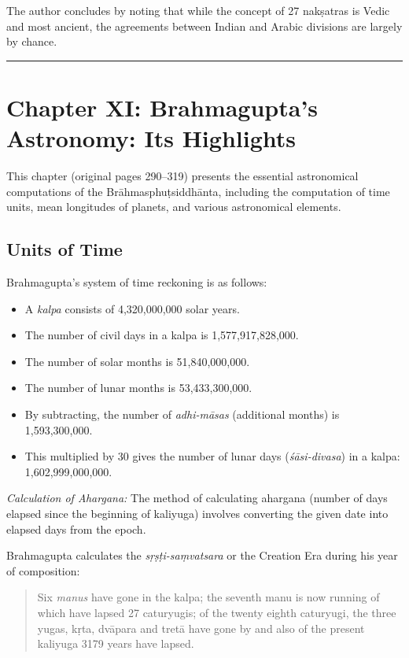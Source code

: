 \documentclass[11pt,a4paper]{article}
\newcommand{\longline}{\noindent\rule{\textwidth}{0.4pt}}
\theoremstyle{definition}
\begin{document}
The author concludes by noting that while the concept of 27 nak\d{s}atras is Vedic and most ancient, the agreements between Indian and Arabic divisions are largely by chance.

\longline

\section{Chapter XI: Brahmagupta's Astronomy: Its Highlights}
\label{sec:astronomy}

This chapter (original pages 290--319) presents the essential astronomical computations of the Br\=ahmasphu\d{t}siddh\=anta, including the computation of time units, mean longitudes of planets, and various astronomical elements.

\subsection{Units of Time}

Brahmagupta's system of time reckoning is as follows:

\begin{itemize}
  \item A \textit{kalpa} consists of 4,320,000,000 solar years.
  \item The number of civil days in a kalpa is 1,577,917,828,000.
  \item The number of solar months is 51,840,000,000.
  \item The number of lunar months is 53,433,300,000.
  \item By subtracting, the number of \textit{adhi-m\=asas} (additional months) is 1,593,300,000.
  \item This multiplied by 30 gives the number of lunar days (\textit{\'s\=asi-divasa}) in a kalpa: 1,602,999,000,000.
\end{itemize}

\textit{Calculation of Ahargana:} The method of calculating ahargana (number of days elapsed since the beginning of kaliyuga) involves converting the given date into elapsed days from the epoch.

Brahmagupta calculates the \textit{s\d{r}\d{s}\d{t}i-sa\d{m}vatsara} or the Creation Era during his year of composition:
\begin{quote}
Six \textit{manus} have gone in the kalpa; the seventh manu is now running of which have lapsed 27 caturyugis; of the twenty eighth caturyugi, the three yugas, k\d{r}ta, dv\=apara and tret\=a have gone by and also of the present kaliyuga 3179 years have lapsed.
\end{quote}
\end{document}
